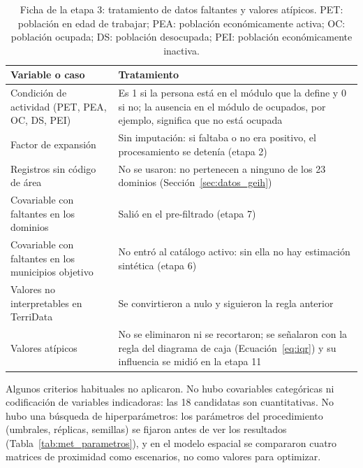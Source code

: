 \begin{table}[!htbp]
\centering
\small
\caption[Ficha de la etapa 3: tratamiento de datos faltantes y valores atípicos]{Ficha de la etapa 3: tratamiento de datos faltantes y valores atípicos. PET: población en edad de trabajar; PEA: población económicamente activa; OC: población ocupada; DS: población desocupada; PEI: población económicamente inactiva.}
\label{tab:met_faltantes}
\renewcommand{\arraystretch}{1.15}
\begin{tabularx}{\linewidth}{>{\raggedright\arraybackslash}p{3.2cm} >{\raggedright\arraybackslash}X}
\toprule
Variable o caso & Tratamiento \\
\midrule
Condición de actividad (PET, PEA, OC, DS, PEI) & Es 1 si la persona está en el módulo que la define y 0 si no; la ausencia en el módulo de ocupados, por ejemplo, significa que no está ocupada \\
Factor de expansión & Sin imputación: si faltaba o no era positivo, el procesamiento se detenía (etapa 2) \\
Registros sin código de área & No se usaron: no pertenecen a ninguno de los 23 dominios (Sección~\ref{sec:datos_geih}) \\
Covariable con faltantes en los dominios & Salió en el pre-filtrado (etapa 7) \\
Covariable con faltantes en los municipios objetivo & No entró al catálogo activo: sin ella no hay estimación sintética (etapa 6) \\
Valores no interpretables en TerriData & Se convirtieron a nulo y siguieron la regla anterior \\
Valores atípicos & No se eliminaron ni se recortaron; se señalaron con la regla del diagrama de caja (Ecuación~\ref{eq:iqr}) y su influencia se midió en la etapa 11 \\
\bottomrule
\end{tabularx}
\end{table}

Algunos criterios habituales no aplicaron. No hubo covariables categóricas ni codificación de variables indicadoras: las 18 candidatas son cuantitativas. No hubo una búsqueda de hiperparámetros: los parámetros del procedimiento (umbrales, réplicas, semillas) se fijaron antes de ver los resultados (Tabla~\ref{tab:met_parametros}), y en el modelo espacial se compararon cuatro matrices de proximidad como escenarios, no como valores para optimizar.

